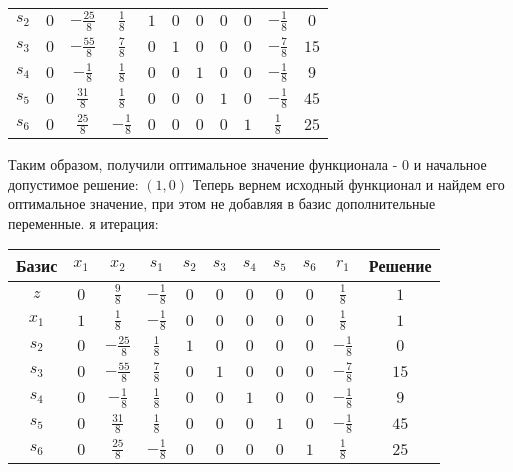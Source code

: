 \documentclass{article}%
\begin{document}
\begin{flushleft}
\begin{tabular}{|c|ccccccccc|c|}
$s_{2}$&$0$&$-\frac{25}{8}$&$\frac{1}{8}$&$1$&$0$&$0$&$0$&$0$&$-\frac{1}{8}$&$0$\\%
$s_{3}$&$0$&$-\frac{55}{8}$&$\frac{7}{8}$&$0$&$1$&$0$&$0$&$0$&$-\frac{7}{8}$&$15$\\%
$s_{4}$&$0$&$-\frac{1}{8}$&$\frac{1}{8}$&$0$&$0$&$1$&$0$&$0$&$-\frac{1}{8}$&$9$\\%
$s_{5}$&$0$&$\frac{31}{8}$&$\frac{1}{8}$&$0$&$0$&$0$&$1$&$0$&$-\frac{1}{8}$&$45$\\%
$s_{6}$&$0$&$\frac{25}{8}$&$-\frac{1}{8}$&$0$&$0$&$0$&$0$&$1$&$\frac{1}{8}$&$25$\\%
\hline%
\end{tabular}%
\newline%
\newline%
Таким образом, получили оптимальное значение функционала {-} 0 и начальное допустимое решение: %
$(1, 0)$%
\newline%
Теперь вернем исходный функционал и найдем его оптимальное значение, при этом не добавляя в базис дополнительные переменные.%
я итерация: %
\newline%
\newline%
\renewcommand{\arraystretch}{1.3}%
\begin{tabular}{|c|ccccccccc|c|}%
\hline%
Базис&$x_{1}$&$x_{2}$&$s_{1}$&$s_{2}$&$s_{3}$&$s_{4}$&$s_{5}$&$s_{6}$&$r_{1}$&Решение\\%
\hline%
$z$&$0$&$\frac{9}{8}$&$-\frac{1}{8}$&$0$&$0$&$0$&$0$&$0$&$\frac{1}{8}$&$1$\\%
\hline%
$x_{1}$&$1$&$\frac{1}{8}$&$-\frac{1}{8}$&$0$&$0$&$0$&$0$&$0$&$\frac{1}{8}$&$1$\\%
$s_{2}$&$0$&$-\frac{25}{8}$&$\frac{1}{8}$&$1$&$0$&$0$&$0$&$0$&$-\frac{1}{8}$&$0$\\%
$s_{3}$&$0$&$-\frac{55}{8}$&$\frac{7}{8}$&$0$&$1$&$0$&$0$&$0$&$-\frac{7}{8}$&$15$\\%
$s_{4}$&$0$&$-\frac{1}{8}$&$\frac{1}{8}$&$0$&$0$&$1$&$0$&$0$&$-\frac{1}{8}$&$9$\\%
$s_{5}$&$0$&$\frac{31}{8}$&$\frac{1}{8}$&$0$&$0$&$0$&$1$&$0$&$-\frac{1}{8}$&$45$\\%
$s_{6}$&$0$&$\frac{25}{8}$&$-\frac{1}{8}$&$0$&$0$&$0$&$0$&$1$&$\frac{1}{8}$&$25$\\%
\hline%
\end{tabular}%
\newline%
\newline%
\newline%
\begin{tabular}{|cccc|}%

\end{tabular}
\end{flushleft}
\end{document}
